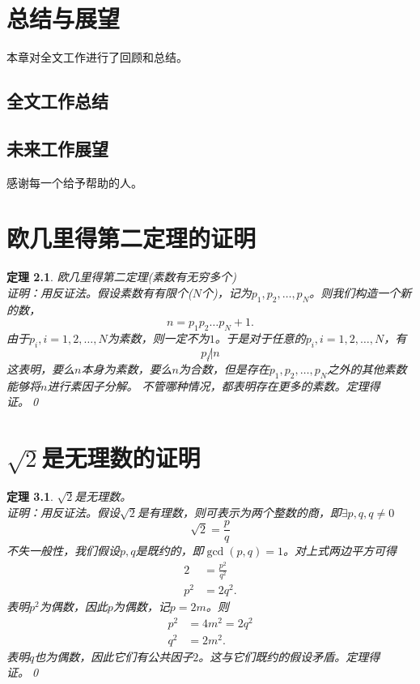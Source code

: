 \documentclass[algorithmlist, figurelist,tablelist, nomlist,engineering]{seuthesix}
\begin{document}
\chapter{总结与展望}
本章对全文工作进行了回顾和总结。
\section{全文工作总结}
\section{未来工作展望}

\acknowledgement
感谢每一个给予帮助的人。






\appendix

\chapter{欧几里得第二定理的证明}
\newtheorem{theorem}{定理}
\begin{theorem}
欧几里得第二定理(素数有无穷多个)\\
证明：用反证法。假设素数有有限个($N$个)，记为$p_1,p_2,\dots,p_N$。则我们构造一个新的数，
\[
n=p_1p_2\dots p_N+1.
\]
由于$p_i,i=1,2,\dots,N$为素数，则一定不为$1$。于是对于任意的$p_i,i=1,2,\dots, N$，有
\[
p_i\not|n
\]
这表明，要么$n$本身为素数，要么$n$为合数，但是存在$p_1,p_2,\dots,p_N$之外的其他素数能够将$n$进行素因子分解。
不管哪种情况，都表明存在更多的素数。定理得证。\qed
\end{theorem}

\chapter{$\sqrt{2}$是无理数的证明}
\begin{theorem}
$\sqrt{2}$是无理数。\\
证明：用反证法。假设$\sqrt{2}$是有理数，则可表示为两个整数的商，即$\exists p,q, q\ne0$
\[
\sqrt{2}=\frac{p}{q}
\]
不失一般性，我们假设$p,q$是既约的，即$\gcd(p,q)=1$。对上式两边平方可得\\
\begin{align*}
2& =\frac{p^2}{q^2}\\
p^2&=2q^2.
\end{align*}
表明$p^2$为偶数，因此$p$为偶数，记$p=2m$。则
\begin{align*}
p^2&=4m^2=2q^2\\
q^2&=2m^2.
\end{align*}
表明$q$也为偶数，因此它们有公共因子$2$。这与它们既约的假设矛盾。定理得证。\qed
\end{theorem}

\end{document}
